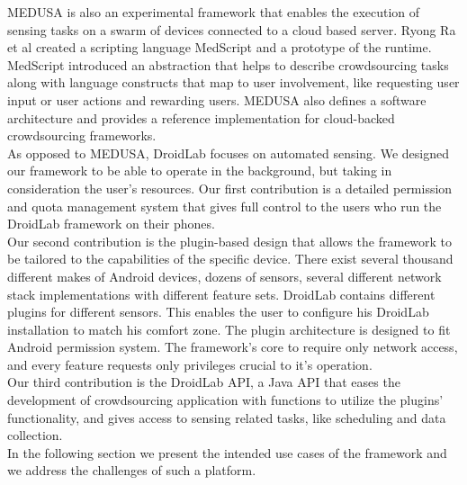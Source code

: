 \documentclass[conference,letterpaper]{IEEEtran}
\begin{document}
\indent MEDUSA \cite{Ra} is also an experimental framework that enables the execution of sensing tasks on a swarm of devices connected to a cloud based server. Ryong Ra et al created a scripting language MedScript and a prototype of the runtime. MedScript introduced an abstraction that helps to describe crowdsourcing tasks along with language constructs that map to user involvement, like requesting user input or user actions and rewarding users. MEDUSA also defines a software architecture and provides a reference implementation for cloud-backed crowdsourcing frameworks.\\
\indent As opposed to MEDUSA, DroidLab focuses on automated sensing. We designed our framework to be able to operate in the background, but taking in consideration the user's resources. Our first contribution is a detailed permission and quota management system that gives full control to the users who run the DroidLab framework on their phones.\\
\indent Our second contribution is the plugin-based design that allows the framework to be tailored to the capabilities of the specific device. There exist several thousand different makes of Android devices, dozens of sensors, several different network stack implementations with different feature sets. DroidLab contains different plugins for different sensors. This enables the user to configure his DroidLab installation to match his comfort zone. The plugin architecture is designed to fit Android permission system. The framework's core to require only network access, and every feature requests only privileges crucial to it's operation.\\
\indent Our third contribution is the DroidLab API, a Java API that eases the development of crowdsourcing application with functions to utilize the plugins' functionality, and gives access to sensing related tasks, like scheduling and data collection.\\
\indent In the following section we present the intended use cases of the framework and we address the challenges of such a platform.
\end{document}
